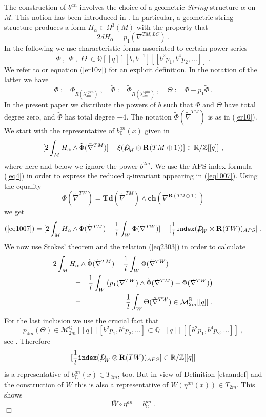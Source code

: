 \documentclass[12pt]{article}
\newcommand{\cM}{{\mathcal{M}}}
\def\hB{\hspace*{\fill}$\Box$ \newline\noindent}
\newcommand{\Z}{{\mathbb{Z}}}
\newcommand{\Q}{{\mathbb{Q}}}
\newcommand{\R}{{\mathbb{R}}}
\newcommand{\C}{{\mathbb{C}}}
\newcommand{\Td}{{\mathbf{Td}}}
\newcommand{\ch}{{\mathbf{ch}}}
\newcommand{\bR}{{\mathbf{R}}}
\newcommand{\Dirac}{{D\hspace{-0.27cm}/}}
\newcommand{\ind}{{\tt index}}
\begin{document}
The construction of $b^{an}$ involves the choice of a geometric $String$-structure $\alpha$ on $M$. 
This notion has been introduced in \cite{2009arXiv0906.0117W}. In particular, a geometric string structure  produces a
form $H_{\alpha}\in \Omega^{3}(M)$ with the property that 
\begin{equation}\label{eq2303}2dH_{\alpha}=p_{1}(\nabla^{TM,LC})\ .\end{equation}
In the following we use  characteristic forms associated to certain power series $$\tilde \Phi\ , \:\:\Phi\ , \:\:\Theta\:\in \Q[[q]][b,b^{-1}][[b^{2}p_{1},b^{4}p_{2},\dots]]\ .$$  We refer to   \cite[Sec 3.3]{2009arXiv0912.4875B}  or equation  (\ref{er10v}) for an explicit definition. In the notation of the latter we have
$$\Phi:=\Phi_{R(\lambda_{4m}^{Spin})}\ ,\quad  \tilde \Phi:=\tilde \Phi_{R(\lambda_{4m}^{Spin})}\ , \quad 
\Theta:=\Phi-p_{1}\tilde \Phi\ .$$
In the present paper we distribute the powers of $b$ such that
$\Phi$ and $\Theta$ have total degree zero, and $\tilde \Phi$ has total degree $-4$.
The notation $\tilde \Phi(\tilde \nabla^{TM})$ is as in (\ref{er10}).
We start with the representative of $b_{\C}^{an}(x)$ given in
 \cite[Def 4.1]{2009arXiv0912.4875B}  
\begin{equation}\label{eq1007}[2\int_{M} H_{\alpha}  \wedge \tilde \Phi(\tilde \nabla^{TM})]- \xi(\Dirac_{M}\otimes \bR(TM\oplus 1))]\in \R/\Z[[q]]\ ,\end{equation}
where here and below we ignore the power $b^{2m}$.
We use the APS index formula (\ref{eq4}) in order to express the reduced $\eta$-invariant appearing in  (\ref{eq1007}).
Using the equality 
$$\Phi(\tilde \nabla^{TW})=\Td(\tilde \nabla^{TM})\wedge \ch(\nabla^{\bR(TM\oplus 1)})$$
we get
$$(\ref{eq1007})= [2\int_{M} H_{\alpha}  \wedge \tilde \Phi(\tilde \nabla^{TM})-\frac{1}{l}\int_{W} \Phi(\tilde \nabla^{TW})]+[\frac{1}{l}\ind(\Dirac_{W}\otimes \bR(TW))_{APS}]\ .$$
We now use Stokes' theorem and the relation (\ref{eq2303})  in order to calculate
\begin{eqnarray*}\lefteqn{
2\int_{M} H_{\alpha}  \wedge \tilde \Phi(\tilde \nabla^{TM})-\frac{1}{l}\int_{W}\Phi(\tilde \nabla^{TW})}\hspace{1cm}&&\\&=&\frac{1}{l}\int_{W} \left( p_{1}(  \nabla^{TW})\wedge \tilde \Phi(\tilde \nabla^{TM})-\Phi(\tilde \nabla^{TW})\right)\\&=&\frac{1}{l}\int_{W} \Theta(\tilde \nabla^{TW})\in \cM_{2m}^{\R}[[q]]\ .
\end{eqnarray*}
For the last inclusion we use the crucial fact that
$$p_{4m}(\Theta)\in \cM_{2m}^{\Q}[[q]][b^{2}p_{1},b^{4}p_{2},\dots]\subset  \Q[[q]][[b^{2}p_{1},b^{4}p_{2},\dots]] \ ,$$
see \cite[Sec. 3.3]{2009arXiv0912.4875B}.
Therefore
$$ [\frac{1}{l}\ind(\Dirac_{W}\otimes \bR(TW))_{APS}]\in \R/\Z[[q]]$$ is a representative of
$b_{\C}^{an}(x)\in T_{2m}$, too. But in view of Definition \ref{etaandef}
and the construction of $\bar W$ this is also a representative of 
$\bar W(\eta^{an}(x))\in T_{2m}$. This shows
$$\bar W\circ \eta^{an}=b^{an}_{\C}\ .$$
\hB 
\end{document}
